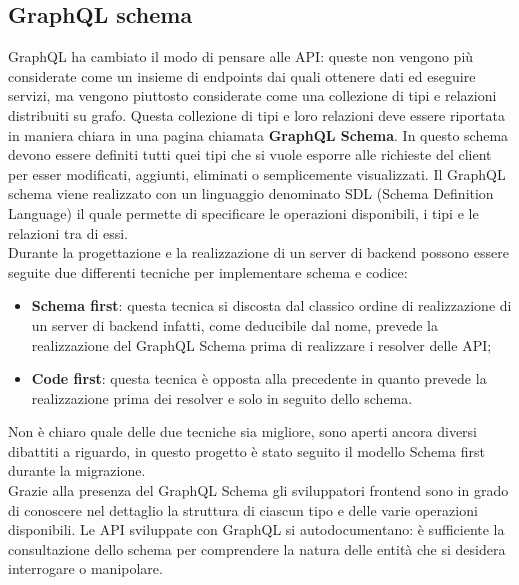 \subsection*{GraphQL schema}
GraphQL ha cambiato il modo di pensare alle API: queste non vengono più considerate come un insieme di endpoints dai quali ottenere dati ed eseguire servizi, ma vengono piuttosto considerate come una collezione di tipi e relazioni distribuiti su grafo. Questa collezione di tipi e loro relazioni deve essere riportata in maniera chiara in una pagina chiamata \textbf{GraphQL Schema}. In questo schema devono essere definiti tutti quei tipi che si vuole esporre alle richieste del client per esser modificati, aggiunti, eliminati o semplicemente visualizzati. Il GraphQL schema viene realizzato con un linguaggio denominato SDL (Schema Definition Language) il quale permette di specificare le operazioni disponibili, i tipi e le relazioni tra di essi.\\
Durante la progettazione e la realizzazione di un server di backend possono essere seguite due differenti tecniche per implementare schema e codice:
\begin{itemize}
  \item \textbf{Schema first}: questa tecnica si discosta dal classico ordine di realizzazione di un server di backend infatti, come deducibile dal nome, prevede la realizzazione del GraphQL Schema prima di realizzare i resolver delle API;
  \item \textbf{Code first}: questa tecnica è opposta alla precedente in quanto prevede la realizzazione prima dei resolver e solo in seguito dello schema.
\end{itemize}
Non è chiaro quale delle due tecniche sia migliore, sono aperti ancora diversi dibattiti a riguardo, in questo progetto è stato seguito il modello Schema first durante la migrazione.\\
Grazie alla presenza del GraphQL Schema gli sviluppatori frontend sono in grado di conoscere nel dettaglio la struttura di ciascun tipo e delle varie operazioni disponibili. Le API sviluppate con GraphQL si autodocumentano: è sufficiente la consultazione dello schema per comprendere la natura delle entità che si desidera interrogare o manipolare.

